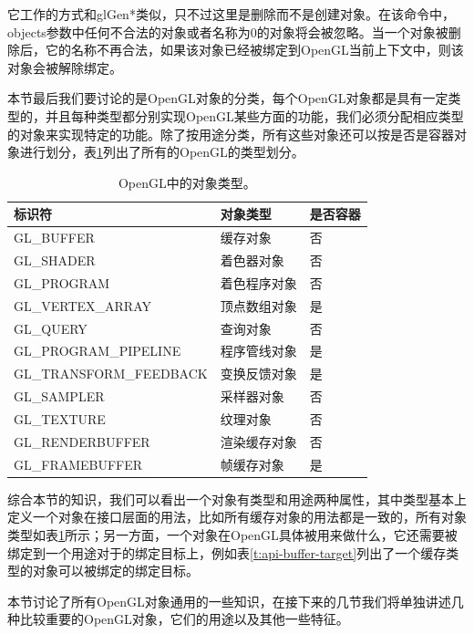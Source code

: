 它工作的方式和glGen*类似，只不过这里是删除而不是创建对象。在该命令中，objects参数中任何不合法的对象或者名称为0的对象将会被忽略。当一个对象被删除后，它的名称不再合法，如果该对象已经被绑定到OpenGL当前上下文中，则该对象会被解除绑定。

本节最后我们要讨论的是OpenGL对象的分类，每个OpenGL对象都是具有一定类型的，并且每种类型都分别实现OpenGL某些方面的功能，我们必须分配相应类型的对象来实现特定的功能。除了按用途分类，所有这些对象还可以按是否是容器对象进行划分，表\ref{t:api-object-types}列出了所有的OpenGL的类型划分。

\begin{table}
\caption{OpenGL中的对象类型。}
\label{t:api-object-types}
\centering
\begin{tabular}{>{\small}p{}|>{\small}p{}|>{\small}p{}}
\hline 
   标识符 & 对象类型 & 是否容器  \\
    \hline  
  GL\_BUFFER              &缓存对象 &否\\
  GL\_SHADER              &着色器对象 &否\\
  GL\_PROGRAM             &着色程序对象 &否\\
  GL\_VERTEX\_ARRAY       &顶点数组对象 &是\\
  GL\_QUERY               &查询对象 &否\\
  GL\_PROGRAM\_PIPELINE   &程序管线对象 &是\\
  GL\_TRANSFORM\_FEEDBACK &变换反馈对象 &是\\
  GL\_SAMPLER             &采样器对象 &否\\
  GL\_TEXTURE             &纹理对象 &否\\
  GL\_RENDERBUFFER        &渲染缓存对象 &否\\
  GL\_FRAMEBUFFER         &帧缓存对象 &是\\

 \hline 
\end{tabular}
\end{table}

综合本节的知识，我们可以看出一个对象有类型和用途两种属性，其中类型基本上定义一个对象在接口层面的用法，比如所有缓存对象的用法都是一致的，所有对象类型如表\ref{t:api-object-types}所示；另一方面，一个对象在OpenGL具体被用来做什么，它还需要被绑定到一个用途对于的绑定目标上，例如表\ref{t:api-buffer-target}列出了一个缓存类型的对象可以被绑定的绑定目标。

本节讨论了所有OpenGL对象通用的一些知识，在接下来的几节我们将单独讲述几种比较重要的OpenGL对象，它们的用途以及其他一些特征。





